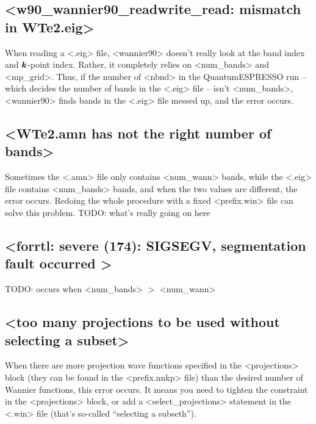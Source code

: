 \documentclass[hyperref, a4paper, 12pt]{report}
\def\texttt#1{<#1>}%
\newcommand{\shortcode}[1]{\texttt{#1}}
\begin{document}
\subsection{\shortcode{w90_wannier90_readwrite_read: mismatch in WTe2.eig}}\label{sec:wannier.mismatch-eig}

When reading a \shortcode{.eig} file, 
\shortcode{wannier90} doesn't really look at the band index and $\vb*{k}$-point index.
Rather, it completely relies on \shortcode{num_bands} and \shortcode{mp_grid}.
Thus, if the number of \shortcode{nbnd} in the QuantumESPRESSO run -- 
which decides the number of bands in the \shortcode{.eig} file -- 
isn't \shortcode{num_bands}, 
\shortcode{wannier90} finds bands in the \shortcode{.eig} file messed up,
and the error occurs.

\subsection{\shortcode{WTe2.amn has not the right number of bands}}

Sometimes the \shortcode{.amn} file only contains 
\shortcode{num_wann} bands,
while the \shortcode{.eig} file contains \shortcode{num_bands} bands,
and when the two values are different,
the error occurs. 
Redoing the whole procedure with a fixed \shortcode{prefix.win} file 
can solve this problem.
TODO: what's really going on here

\subsection{\shortcode{forrtl: severe (174): SIGSEGV, segmentation fault occurred }}

TODO: occurs when \shortcode{num_bands} $>$ \shortcode{num_wann}

\subsection{\shortcode{too many projections to be used without selecting a subset}}

When there are more 
projection wave functions specified in the \shortcode{projections} block 
(they can be found in the \shortcode{prefix.nnkp} file)
than the desired number of Wannier functions,
this error occurs.
It means you need to tighten the constraint in the \shortcode{projections} block, 
or add a \shortcode{select_projections} statement in the \shortcode{.win} file
(that's so-called ``selecting a subseth'').
\end{document}
